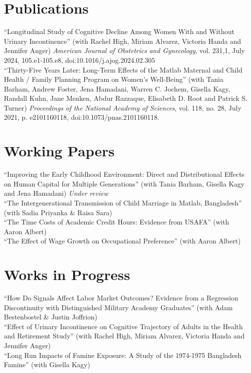 \documentclass[letterpaper]{article}
\begin{document}
\section*{Publications}
``Longitudinal Study of Cognitive Decline Among Women With and Without Urinary Incontinence'' (with Rachel High, Miriam Alvarez, Victoria Handa and Jennifer Anger)  \textit{American Journal of Obstetrics and Gynecology}, vol. 231,1, July 2024, 105.e1-105.e8, doi:10.1016/j.ajog.2024.02.305
\\[.5em]
``Thirty-Five Years Later: Long-Term Effects of the Matlab Maternal and Child Health / Family Planning Program on Women's Well-Being'' (with Tania Barham, Andrew Foster, Jena Hamadani, Warren C. Jochem, Gisella Kagy, Randall Kuhn, Jane Menken, Abdur Razzaque, Elisabeth D. Root and Patrick S. Turner) \textit{Proceedings of the National Academy of Sciences}, vol. 118, no. 28, July 2021, p. e2101160118, doi:10.1073/pnas.2101160118.

\section*{Working Papers}
``Improving the Early Childhood Environment: Direct and Distributional Effects on Human Capital for Multiple Generations'' (with Tania Barham, Gisella Kagy and Jena Hamadani) \textit{Under review}
\\[.5em]
``The Intergenerational Transmission of Child Marriage in Matlab, Bangladesh'' (with Sadia Priyanka \& Raisa Sara)
\\[.5em]
``The Time Costs of Academic Credit Hours: Evidence from USAFA'' (with Aaron Albert)
\\[.5em]
``The Effect of Wage Growth on Occupational Preference'' (with Aaron Albert)

\section*{Works in Progress}
``How Do Signals Affect Labor Market Outcomes? Evidence from a Regression Discontinuity with Distinguished Military Academy Graduates'' (with Adam Bestenbostel \& Justin Joffrion)
\\[.5em]
``Effect of Urinary Incontinence on Cognitive Trajectory of Adults in the Health and Retirement Study'' (with Rachel High, Miriam Alvarez, Victoria Handa and Jennifer Anger)
\\[.5em]
``Long Run Impacts of Famine Exposure: A Study of the 1974-1975 Bangladesh Famine'' (with Gisella Kagy)
\end{document}
